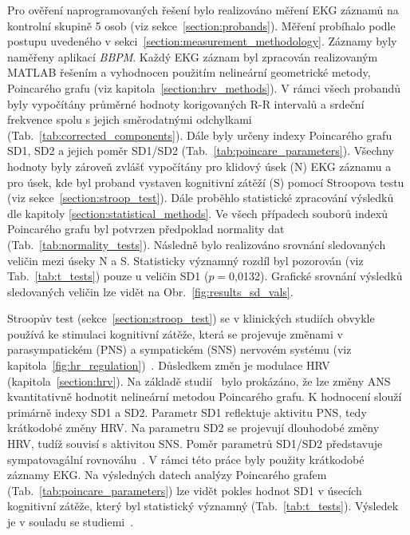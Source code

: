Pro ověření naprogramovaných řešení bylo realizováno měření EKG záznamů na
kontrolní skupině 5 osob (viz sekce~\ref{section:probands}). Měření probíhalo
podle postupu uvedeného v sekci~\ref{section:measurement_methodology}. Záznamy
byly naměřeny aplikací \textit{BBPM}. Každý EKG záznam byl zpracován
realizovaným MATLAB řešením a vyhodnocen použitím nelineární
geometrické metody, Poincarého grafu (viz kapitola~\ref{section:hrv_methods}). V
rámci všech probandů byly vypočítány průměrné hodnoty korigovaných R-R intervalů
a srdeční frekvence spolu s jejich směrodatnými odchylkami
(Tab.~\ref{tab:corrected_components}). Dále byly určeny indexy Poincarého grafu
SD1, SD2 a jejich poměr SD1/SD2 (Tab.~\ref{tab:poincare_parameters}). Všechny hodnoty byly
zároveň zvlášť vypočítány pro klidový úsek (N) EKG záznamu a pro úsek, kde byl
proband vystaven kognitivní zátěží (S) pomocí Stroopova testu (viz
sekce~\ref{section:stroop_test}). Dále proběhlo statistické zpracování výsledků
dle kapitoly \ref{section:statistical_methods}. Ve všech případech souborů
indexů Poincarého grafu byl potvrzen předpoklad normality dat
(Tab.~\ref{tab:normality_tests}). Následně bylo realizováno srovnání sledovaných
veličin mezi úseky N a S. Statisticky významný rozdíl byl pozorován (viz
Tab.~\ref{tab:t_tests}) pouze u veličin SD1 ($p=$0,0132). Grafické srovnání
výsledků sledovaných veličin lze vidět na Obr.~\ref{fig:results_sd_vals}.

Stroopův test (sekce~\ref{section:stroop_test}) se v klinických studiích obvykle
používá ke stimulaci kognitivní zátěže, která se projevuje změnami v
parasympatickém (PNS) a sympatickém (SNS) nervovém systému (viz
kapitola~\ref{fig:hr_regulation})~\cite{Hoshikawa1997}. Důsledkem změn je
modulace HRV (kapitola~\ref{section:hrv}). Na základě
studií~\cite{Brennan2001,Kamen1996} bylo prokázáno, že lze změny ANS
kvantitativně hodnotit nelineární metodou Poincarého grafu. K hodnocení slouží
primárně indexy SD1 a SD2. Parametr SD1 reflektuje aktivitu PNS, tedy krátkodobé
změny HRV. Na parametru SD2 se projevují dlouhodobé změny HRV, tudíž souvisí s
aktivitou SNS. Poměr parametrů SD1/SD2 představuje sympatovagální
rovnováhu~\cite{Hsu2012,Habib2013,Mazhar2007}. V rámci této práce byly použity
krátkodobé záznamy EKG. Na výsledných datech analýzy Poincarého grafem
(Tab.~\ref{tab:poincare_parameters}) lze vidět pokles hodnot SD1 v úsecích
kognitivní zátěže, který byl statistický významný (Tab.~\ref{tab:t_tests}).
Výsledek je v souladu se
studiemi~\cite{Sebastiano2019,Brugnera2018,Vazan2017,Melillo2011}.




















